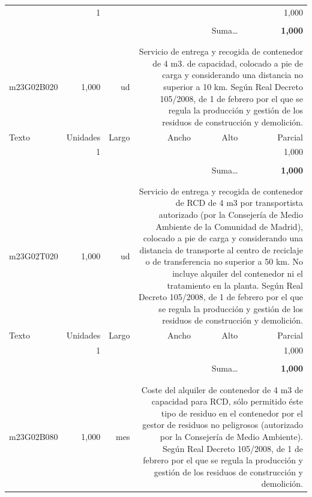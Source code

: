 \documentclass{book}%
\begin{document}
\begin{longtable}{lrrrrr}
\hline%
\multicolumn{1}{p{3.5cm}}{ }&1&&&&     1,000\\%
&&&&&\\%
\multicolumn{5}{r}{Suma\ldots}&\textbf{     1,000}\\%
\hline%
&&&&&\\%
&&&&&\\%
m23G02B020&     1,000& ud&\multicolumn{3}{p{6cm}}{\scriptsize Servicio de entrega y recogida de contenedor de 4 m3. de capacidad, colocado a pie de carga y considerando una distancia no superior a 10 km. Según Real Decreto 105/2008, de 1 de febrero por el que se regula la producción y gestión de los residuos de construcción y demolición.\normalsize}\\%
Texto&Unidades&Largo&Ancho&Alto&Parcial\\%
\hline%
\multicolumn{1}{p{3.5cm}}{ }&1&&&&     1,000\\%
&&&&&\\%
\multicolumn{5}{r}{Suma\ldots}&\textbf{     1,000}\\%
\hline%
&&&&&\\%
&&&&&\\%
m23G02T020&     1,000& ud&\multicolumn{3}{p{6cm}}{\scriptsize Servicio de entrega y recogida de contenedor de RCD de 4 m3 por transportista autorizado (por la Consejería de Medio Ambiente de la Comunidad de Madrid), colocado a pie de carga y considerando una distancia de transporte al centro de reciclaje o de transferencia no superior a 50 km. No incluye alquiler del contenedor ni el tratamiento en la planta. Según Real Decreto 105/2008, de 1 de febrero por el que se regula la producción y gestión de los residuos de construcción y demolición.\normalsize}\\%
Texto&Unidades&Largo&Ancho&Alto&Parcial\\%
\hline%
\multicolumn{1}{p{3.5cm}}{ }&1&&&&     1,000\\%
&&&&&\\%
\multicolumn{5}{r}{Suma\ldots}&\textbf{     1,000}\\%
\hline%
&&&&&\\%
&&&&&\\%
m23G02B080&     1,000& mes&\multicolumn{3}{p{6cm}}{\scriptsize Coste del alquiler de contenedor de 4 m3 de capacidad para RCD, sólo permitido éste tipo de residuo en el contenedor por el gestor de residuos no peligrosos (autorizado por la Consejería de Medio Ambiente). Según Real Decreto 105/2008, de 1 de febrero por el que se regula la producción y gestión de los residuos de construcción y demolición.\normalsize}\\%

\end{longtable}
\end{document}
